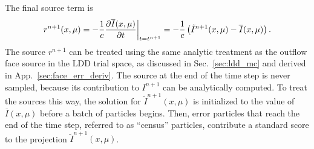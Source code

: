 The final source term is
\begin{equation}
    r^{n+1}(x,\mu) = -\frac{1}{c}\frac{\partial \overline{I}(x,\mu)}{\partial t}\bigg|_{t=t^{n+1}}
    =-\frac{1}{c}\left(\tilde I^{n+1}(x,\mu) - \overline I(x,\mu)\right).
\end{equation}
The source $r^{n+1}$ can be treated using the
same analytic treatment as the outflow face source in the LDD
trial space, as discussed in Sec.~\ref{sec:ldd_mc} and derived in
App.~\ref{sec:face_err_deriv}.  The source at the end of the time step is
never sampled, because its contribution to $I^{n+1}$ can be analytically computed.  To treat the sources this way, the solution for $\tilde I^{n+1}(x,\mu)$ is
initialized to the value of $\overline I(x,\mu)$ before a batch of particles begins.
Then, error particles that reach the end of the time step, referred to as ``census''
particles, contribute a standard score to the projection $\tilde I^{n+1}(x,\mu)$.

